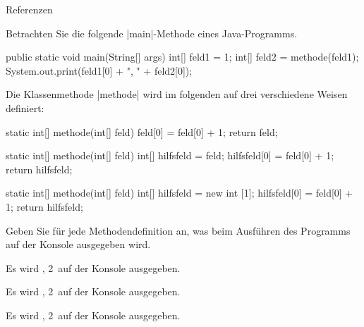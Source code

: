\begin{exercise}{Referenzen}
\begin{body}
Betrachten Sie die folgende \code|main|-Methode eines Java-Programms.
\medskip
\begin{displaycode}
    public static void main(String[] args) {
        int[] feld1 = {1};
        int[] feld2 = methode(feld1);
        System.out.print(feld1[0] + ", " + feld2[0]);
    }
\end{displaycode}
\medskip
\noindent
Die Klassenmethode \code|methode| wird im folgenden auf drei verschiedene Weisen definiert:
\begin{parts}
\item
\begin{displaycode}
    static int[] methode(int[] feld) {
        feld[0] = feld[0] + 1;
        return feld;
    }
\end{displaycode}

\item
\begin{displaycode}
    static int[] methode(int[] feld) {
        int[] hilfsfeld = feld;
        hilfsfeld[0] = feld[0] + 1;
        return hilfsfeld;
    }
\end{displaycode}

\item
\begin{displaycode}
    static int[] methode(int[] feld) {
        int[] hilfsfeld = new int [1];
        hilfsfeld[0] = feld[0] + 1;
        return hilfsfeld;
    }
\end{displaycode}
\end{parts}
Geben Sie für jede Methodendefinition an, was beim Ausführen des Programms auf der Konsole ausgegeben wird.
\end{body}

\begin{solution}
\begin{parts}
\item
Es wird , 2\grqq\ auf der Konsole ausgegeben.

\item
Es wird , 2\grqq\ auf der Konsole ausgegeben.

\item
Es wird , 2\grqq\ auf der Konsole ausgegeben.

\end{parts}
\end{solution}
\end{exercise}
